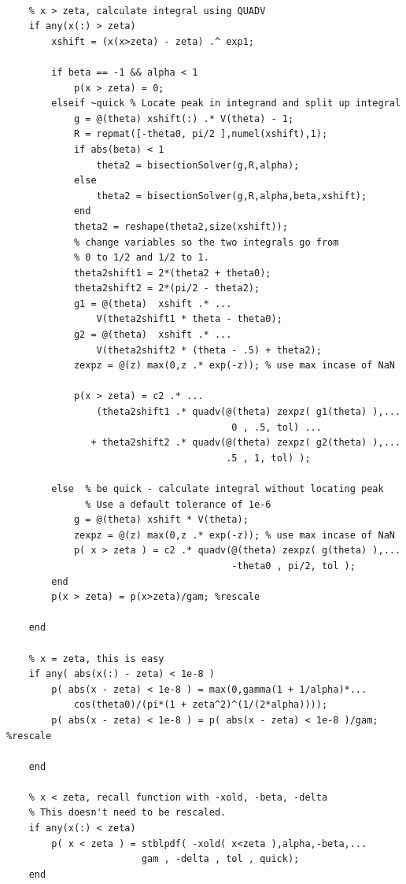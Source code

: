 \documentclass[twoside]{article}
\begin{document}
\begin{lstlisting}
    
    % x > zeta, calculate integral using QUADV
    if any(x(:) > zeta)
        xshift = (x(x>zeta) - zeta) .^ exp1;
        
        if beta == -1 && alpha < 1
            p(x > zeta) = 0;
        elseif ~quick % Locate peak in integrand and split up integral        
            g = @(theta) xshift(:) .* V(theta) - 1;
            R = repmat([-theta0, pi/2 ],numel(xshift),1);
            if abs(beta) < 1
                theta2 = bisectionSolver(g,R,alpha);
            else
                theta2 = bisectionSolver(g,R,alpha,beta,xshift);
            end
            theta2 = reshape(theta2,size(xshift));
            % change variables so the two integrals go from 
            % 0 to 1/2 and 1/2 to 1.
            theta2shift1 = 2*(theta2 + theta0);
            theta2shift2 = 2*(pi/2 - theta2);
            g1 = @(theta)  xshift .* ...
                V(theta2shift1 * theta - theta0);
            g2 = @(theta)  xshift .* ...
                V(theta2shift2 * (theta - .5) + theta2);
            zexpz = @(z) max(0,z .* exp(-z)); % use max incase of NaN
           
            p(x > zeta) = c2 .* ...
                (theta2shift1 .* quadv(@(theta) zexpz( g1(theta) ),...
                                        0 , .5, tol) ...
               + theta2shift2 .* quadv(@(theta) zexpz( g2(theta) ),...
                                       .5 , 1, tol) );                       
                              
        else  % be quick - calculate integral without locating peak
              % Use a default tolerance of 1e-6
            g = @(theta) xshift * V(theta);
            zexpz = @(z) max(0,z .* exp(-z)); % use max incase of NaN
            p( x > zeta ) = c2 .* quadv(@(theta) zexpz( g(theta) ),...
                                        -theta0 , pi/2, tol );  
        end
        p(x > zeta) = p(x>zeta)/gam; %rescale
        
    end
    
    % x = zeta, this is easy
    if any( abs(x(:) - zeta) < 1e-8 )  
        p( abs(x - zeta) < 1e-8 ) = max(0,gamma(1 + 1/alpha)*...
            cos(theta0)/(pi*(1 + zeta^2)^(1/(2*alpha))));
        p( abs(x - zeta) < 1e-8 ) = p( abs(x - zeta) < 1e-8 )/gam; %rescale
        
    end
   
    % x < zeta, recall function with -xold, -beta, -delta 
    % This doesn't need to be rescaled.
    if any(x(:) < zeta)
        p( x < zeta ) = stblpdf( -xold( x<zeta ),alpha,-beta,...
                        gam , -delta , tol , quick); 
    end
        

\end{lstlisting}
\end{document}
